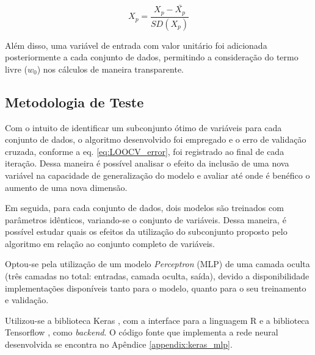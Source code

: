 \begin{equation}
    X_p = \frac{ X_p - \bar{X_p} }{SD(X_p)}
    \label{eq:z-score}
\end{equation}

Além disso, uma variável de entrada com valor unitário foi adicionada posteriormente a cada conjunto de dados, permitindo a consideração do termo livre ($w_0$) nos cálculos de maneira transparente.

\subsection{Metodologia de Teste}

Com o intuito de identificar um subconjunto ótimo de variáveis para cada conjunto de dados, o algoritmo 
desenvolvido foi empregado e o erro de validação cruzada, conforme a eq. \ref{eq:LOOCV_error}, foi registrado ao final de cada iteração. Dessa maneira é possível analisar o efeito da inclusão de uma nova variável na capacidade de generalização do modelo e avaliar até onde é benéfico o aumento de uma nova dimensão.

Em seguida, para cada conjunto de dados, dois modelos são treinados com parâmetros idênticos, variando-se o conjunto de variáveis. Dessa maneira, é possível estudar quais os efeitos da utilização do subconjunto proposto pelo algoritmo em relação ao conjunto completo de variáveis.

Optou-se pela utilização de um modelo \textit{Perceptron} (MLP) de uma camada oculta (três camadas no total: entradas, camada oculta, saída), devido a disponibilidade implementações disponíveis tanto para o modelo, quanto para o seu treinamento e validação.

Utilizou-se a biblioteca Keras \cite{keras}, com a interface para a linguagem R e a biblioteca Tensorflow \cite{tensorflow}, como \textit{backend}. O código fonte que implementa a rede neural desenvolvida se encontra no Apêndice \ref{appendix:keras_mlp}.




